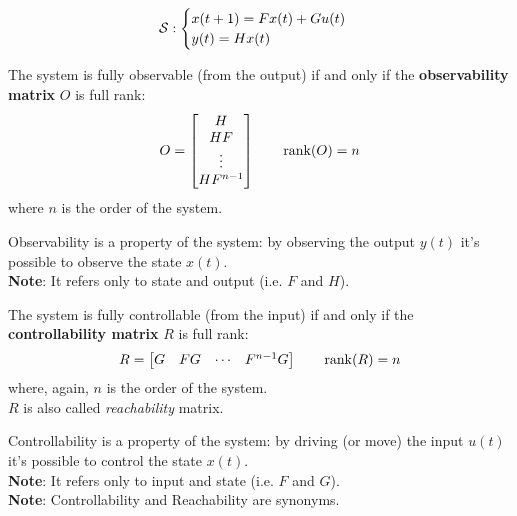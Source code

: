 \[
    \mathcal{S}: 
    \begin{cases}
        x(t+1) = Fx(t) + Gu(t) \\
        y(t) = Hx(t)
    \end{cases}
\]

\begin{defn}
The system is fully observable (from the output) if and only if the \textbf{observability matrix} $O$ is full rank:
\[
    O = \begin{bmatrix}
        H \\
        HF \\
        \vdots \\
        HF^{n-1}
    \end{bmatrix}
    \qquad
    \operatorname*{rank} (O) = n
\]
where $n$ is the order of the system.
\end{defn}

\begin{rem}[Observability]
Observability is a property of the system: by observing the output $y(t)$ it's possible to observe the state $x(t)$.\\
\textbf{Note}: It refers only to state and output (i.e. $F$ and $H$).
\end{rem}

\begin{defn}
The system is fully controllable (from the input) if and only if the \textbf{controllability matrix} $R$ is full rank:
\[
    R = \begin{bmatrix}
        G & FG & \cdots & F^{n-1}G
    \end{bmatrix}
    \qquad
    \operatorname*{rank} (R) = n
\]
where, again, $n$ is the order of the system.\\
$R$ is also called \emph{reachability} matrix.
\end{defn}

\begin{rem}[Controllability]
Controllability is a property of the system: by driving (or move) the input $u(t)$ it's possible to control the state $x(t)$.\\
\textbf{Note}: It refers only to input and state (i.e. $F$ and $G$).\\
\textbf{Note}: Controllability and Reachability are synonyms.
\end{rem}

